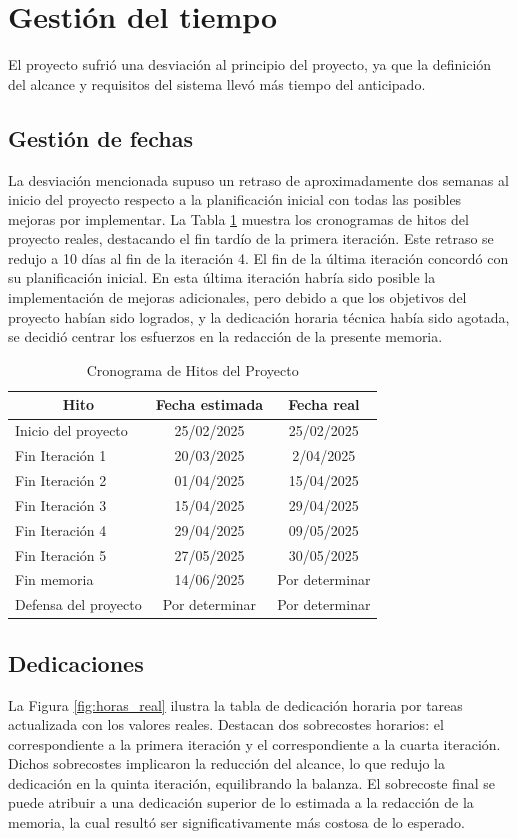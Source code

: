 \section{Gestión del tiempo}
El proyecto sufrió una desviación al principio del proyecto, ya que la definición del alcance y requisitos del sistema llevó más tiempo del anticipado.
\subsection{Gestión de fechas}
La desviación mencionada supuso un retraso de aproximadamente dos semanas al inicio del proyecto respecto a la planificación inicial con todas las posibles mejoras por implementar. La Tabla \ref{tab:hitos_real} muestra los cronogramas de hitos del proyecto reales, destacando el fin tardío de la primera iteración. Este retraso se redujo a 10 días al fin de la iteración 4. El fin de la última iteración concordó con su planificación inicial. En esta última iteración habría sido posible la implementación de mejoras adicionales, pero debido a que los objetivos del proyecto habían sido logrados, y la dedicación horaria técnica había sido agotada, se decidió centrar los esfuerzos en la redacción de la presente memoria. 

\begin{table}[H]\centering
\begin{tabular}{|l|c|c|}
\hline
\multicolumn{1}{|c|}{\textbf{Hito}} & \multicolumn{1}{c|}{\textbf{Fecha estimada}} & \multicolumn{1}{c|}{\textbf{Fecha real}} \\
\hline
Inicio del proyecto & 25/02/2025 & 25/02/2025 \\
\hline
Fin Iteración 1 & 20/03/2025 & 2/04/2025 \\
\hline
Fin Iteración 2 & 01/04/2025 & 15/04/2025 \\
\hline
Fin Iteración 3 & 15/04/2025 & 29/04/2025 \\
\hline
Fin Iteración 4 & 29/04/2025 & 09/05/2025 \\
\hline
Fin Iteración 5 & 27/05/2025 & 30/05/2025 \\
\hline
Fin memoria & 14/06/2025 & Por determinar \\
\hline
Defensa del proyecto & Por determinar & Por determinar \\
\hline
\end{tabular}
\caption{Cronograma de Hitos del Proyecto}
\label{tab:hitos_real}
\end{table}

\subsection{Dedicaciones}
La Figura \ref{fig:horas_real} ilustra la tabla de dedicación horaria por tareas actualizada con los valores reales. Destacan dos sobrecostes horarios: el correspondiente a la primera iteración y el correspondiente a la cuarta iteración. Dichos sobrecostes implicaron la reducción del alcance, lo que redujo la dedicación en la quinta iteración, equilibrando la balanza. El sobrecoste final se puede atribuir a una dedicación superior de lo estimada a la redacción de la memoria, la cual resultó ser significativamente más costosa de lo esperado. 

